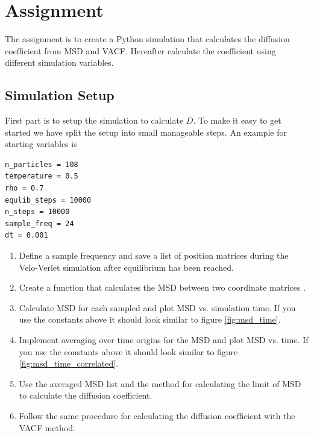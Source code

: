 \documentclass{article}
\begin{document}
\newpage
\section{Assignment}

The assignment is to create a Python simulation that calculates the diffusion coefficient from MSD and VACF.
Hereafter calculate the coefficient using different simulation variables.

\subsection{Simulation Setup}

First part is to setup the simulation to calculate $D$.
To make it easy to get started we have split the setup into small manageable steps.
An example for starting variables is

\begin{lstlisting}
n_particles = 108
temperature = 0.5
rho = 0.7
equlib_steps = 10000
n_steps = 10000
sample_freq = 24
dt = 0.001
\end{lstlisting}

\begin{enumerate}

    \item Define a sample frequency and save a list of position matrices  during the Velo-Verlet simulation after equilibrium has been reached.

    \item Create a function that calculates the MSD between two coordinate matrices .

    \item Calculate MSD for each sampled  and plot MSD vs. simulation time.
    If you use the constants above it should look similar to figure \ref{fig:msd_time}.

    \item Implement averaging over time origins for the MSD and plot MSD vs. time.
    If you use the constants above it should look similar to figure \ref{fig:msd_time_correlated}.

    \item Use the averaged MSD list and the method for calculating the limit of MSD to calculate the diffusion coefficient.

    \item Follow the same procedure for calculating the diffusion coefficient with the VACF method.

\end{enumerate}
\end{document}

